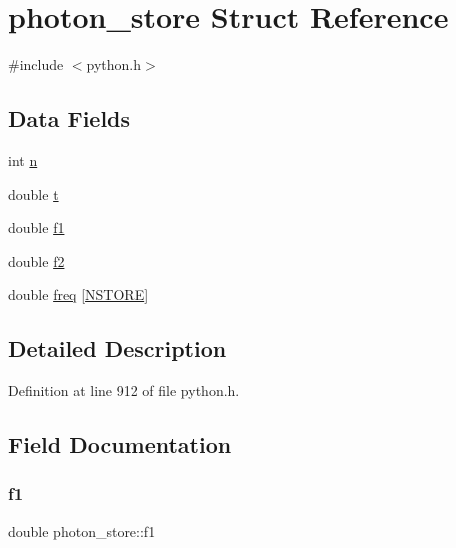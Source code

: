 \hypertarget{structphoton__store}{}\section{photon\+\_\+store Struct Reference}
\label{structphoton__store}


{\ttfamily \#include $<$python.\+h$>$}

\subsection*{Data Fields}
\begin{DoxyCompactItemize}
\item 
int \hyperlink{structphoton__store_a2c21d7cedb5d14f39c75773d8c27cfb9}{n}
\item 
double \hyperlink{structphoton__store_a1f66c34e20651382abba394331cee838}{t}
\item 
double \hyperlink{structphoton__store_a848640b4e4ac5d652a0d7c2b888ad629}{f1}
\item 
double \hyperlink{structphoton__store_a64630dd43adca15e1b6a11eaf32130d7}{f2}
\item 
double \hyperlink{structphoton__store_a0ca5ae358e1d455b4ff924a1a4be00fc}{freq} \mbox{[}\hyperlink{python_8h_a0ce783ce6592faa3e2f8900e2a72846a}{N\+S\+T\+O\+RE}\mbox{]}
\end{DoxyCompactItemize}


\subsection{Detailed Description}


Definition at line 912 of file python.\+h.



\subsection{Field Documentation}
\mbox{\label{structphoton__store_a848640b4e4ac5d652a0d7c2b888ad629}} 
\subsubsection{\texorpdfstring{f1}{f1}}
{\footnotesize\ttfamily double photon\+\_\+store\+::f1}



